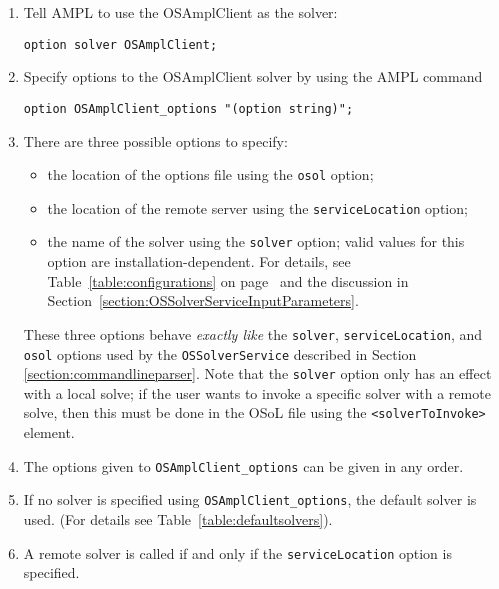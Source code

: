 \begin{enumerate}
\item Tell  AMPL to use the OSAmplClient as the solver:

\begin{verbatim}
option solver OSAmplClient;
\end{verbatim}

\item Specify options to the OSAmplClient solver by using the AMPL command 

\begin{verbatim}
option OSAmplClient_options "(option string)";
\end{verbatim}

\item There are three possible options to specify:

\begin{itemize}
\item the location of the options file using  the {\tt osol} option;

\item the location of the remote server using   the {\tt serviceLocation} option;

\item the name of the solver using the  {\tt solver} option; valid values for this option  are 
installation-dependent. 
For details, see Table~\ref{table:configurations} on page~\pageref{table:configurations} 
and the discussion in Section~\ref{section:OSSolverServiceInputParameters}. 

\end{itemize}

These three options behave {\it exactly like} the {\tt solver}, {\tt serviceLocation}, and {\tt osol} options used by the {\tt OSSolverService} described in  Section \ref{section:commandlineparser}.
Note that the {\tt solver} option only has an effect with a local solve; 
if the user wants to invoke a specific solver with a remote solve, then this must be done in the OSoL file using the {\tt <solverToInvoke>} element.

\item  The options given to {\tt OSAmplClient\_options}  can be given in any order.

\item If no solver is specified using {\tt OSAmplClient\_options},  the default solver is used.
(For details see Table~\ref{table:defaultsolvers}).

\item A remote solver is called if and only if the {\tt serviceLocation} option is specified.

\end{enumerate}

